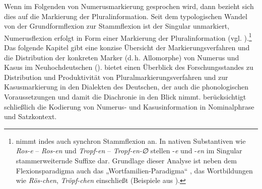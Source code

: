 Wenn im Folgenden von Numerusmarkierung gesprochen wird, dann bezieht sich dies auf die Markierung der Pluralinformation. Seit dem typologischen Wandel von der Grundformflexion zur Stammflexion ist der Singular unmarkiert, Numerusflexion erfolgt in Form einer Markierung der Pluralinformation (vgl. ).\footnote{\citet{Harnisch1994b, Harnisch2001} nimmt indes auch synchron Stammflexion an. In nativen Substantiven wie \textit{Ros-e} -- \textit{Ros-en} und \textit{Tropf-en} -- \textit{Tropf-en-∅} stellen -\textit{e} und -\textit{en} im Singular stammerweiternde Suffixe dar. Grundlage dieser Analyse ist neben dem Flexionsparadigma auch das „Wortfamilien-Paradigma“ \citep{Harnisch2001}, das Wortbildungen wie \textit{Rös-chen}, \textit{Tröpf-chen} einschließt (Beispiele aus \citealt{Harnisch1994b}).}  Das folgende Kapitel gibt eine konzise Übersicht der Markierungsverfahren und die Distribution der konkreten Marker (d.\,h. Allomorphe) von Numerus und Kasus im Neuhochdeutschen ().  bietet einen Überblick des Forschungsstandes zu Distribution und Produktivität von Pluralmarkierungsverfahren und zur Kasusmarkierung in den Dialekten des Deutschen, der auch die phonologischen Voraussetzungen und damit die Diachronie in den Blick nimmt.  berücksichtigt schließlich die Kodierung von Numerus- und Kasusinformation in Nominalphrase und Satzkontext.

